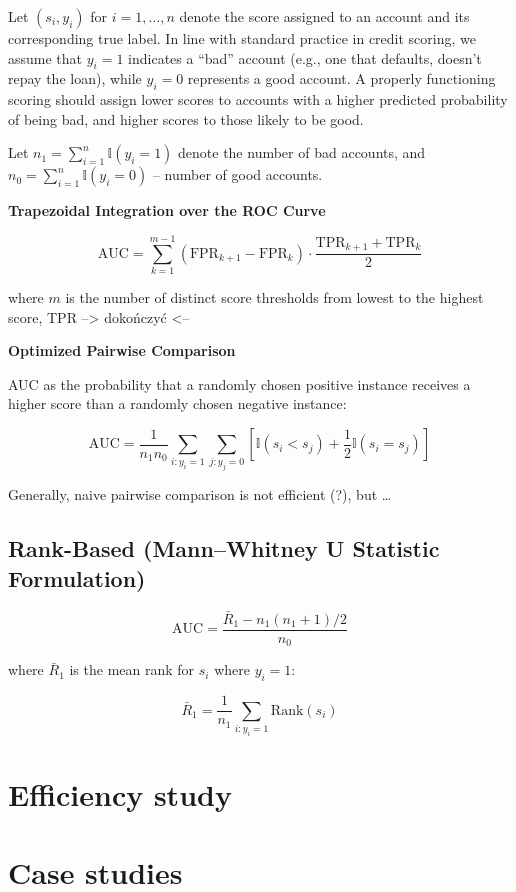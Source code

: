 Let \((s_i, y_i)\) for \(i = 1, \dots, n\) denote the score assigned to an account and its corresponding true label. In line with standard practice in credit scoring, we assume that \(y_i=1\) indicates a ``bad'' account (e.g., one that defaults, doesn't repay the loan), while \(y_i=0\) represents a good account. A properly functioning scoring should assign lower scores to accounts with a higher predicted probability of being bad, and higher scores to those likely to be good.

Let \(n_1 = \sum_{i=1}^{n}\mathbb{I}(y_i=1)\) denote the number of bad accounts, and \(n_0 = \sum_{i=1}^{n}\mathbb{I}(y_i=0)\) -- number of good accounts.

\textbf{Trapezoidal Integration over the ROC Curve}

\[\text{AUC} = \sum_{k=1}^{m-1}(\text{FPR}_{k+1} - \text{FPR}_{k})\cdot\frac{\text{TPR}_{k+1}+\text{TPR}_k}{2}\]

where \(m\) is the number of distinct score thresholds from lowest to the highest score, TPR --\textgreater{} dokończyć \textless--

\textbf{Optimized Pairwise Comparison}

AUC as the probability that a randomly chosen positive instance receives a higher score than a randomly chosen negative instance:

\[\text{AUC} = \frac{1}{n_1 n_0}\sum_{i:y_i=1}\sum_{j:y_j=0}\left[\mathbb{I}(s_i<s_j)+\frac{1}{2}\mathbb{I}(s_i=s_j)\right]\]

Generally, naive pairwise comparison is not efficient (?), but \ldots{}

\subsection{Rank-Based (Mann--Whitney U Statistic Formulation)}\label{rank-based-mannwhitney-u-statistic-formulation}

\[\text{AUC} = \frac{\bar{R}_{1}-{n_1(n_1+1)}/2}{n_0}\]

where \(\bar{R}_{1}\) is the mean rank for \(s_i\) where \(y_i=1\):

\[\bar{R}_{1} = \frac{1}{n_1}\sum_{i:y_i=1}\text{Rank}(s_i)\]

\section{Efficiency study}\label{efficiency-study}

\section{Case studies}\label{case-studies}


